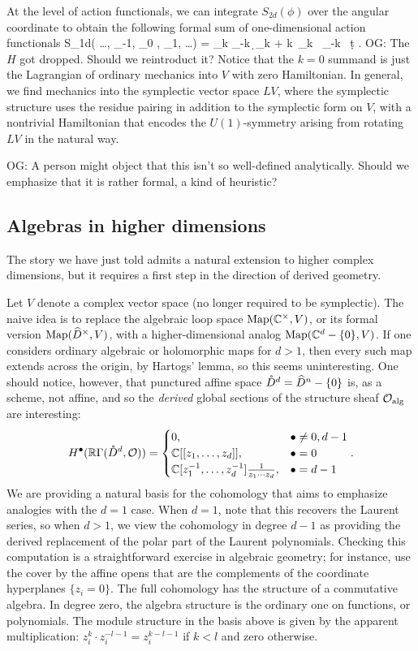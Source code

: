 \documentclass[11pt]{amsart}
\def\owen#1{{\textcolor{violet!50!black}{OG: {#1}}}}
\begin{document}
At the level of action functionals, 
we can integrate $S_{2d}(\phi)$ over the angular coordinate to obtain the following formal sum of one-dimensional action functionals
\beqn
S_{1d}\left( \ldots, \phi_{-1}, \phi_0 , \phi_1, \ldots \right) = \sum_{k\in \ZZ} \int  \phi_{-k} \,\d \phi_{k} + k\, \phi_k \, \phi_{-k} \, \d t .
\eeqn 
\owen{The $H$ got dropped. Should we reintroduct it?}
Notice that the $k=0$ summand is just the Lagrangian of ordinary mechanics into $V$ with zero Hamiltonian. 
In general, we find mechanics into the symplectic vector space $LV$, where the symplectic structure uses the residue pairing in addition to the symplectic form on $V$, with a nontrivial Hamiltonian that encodes the $U(1)$-symmetry arising from rotating $LV$ in the natural way.

\owen{A person might object that this isn't so well-defined analytically. Should we emphasize that it is rather formal, a kind of heuristic?}

\subsection{Algebras in higher dimensions }
\label{s:alghigh}

The story we have just told admits a natural extension to higher complex dimensions,
but it requires a first step in the direction of derived geometry.

Let $V$ denote a complex vector space (no longer required to be symplectic).
The naive idea is to replace the algebraic loop space $\Map(\CC^\times,  V)$, or its formal version $\Map(\Hat{D}^\times, V)$, with a higher-dimensional analog $\Map(\CC^d -\{0\}, V)$.
If one considers ordinary algebraic or holomorphic maps for $d > 1$, 
then every such map extends across the origin, by Hartogs' lemma,
so this seems uninteresting.
One should notice, however, that punctured affine space $\mathring{D}^d = \Hat{D}^n -\{0\}$ is, as a scheme, not affine, 
and so the {\em derived} global sections of the structure sheaf $\cO_{\rm alg}$ are interesting:
\[
H^\bu(\RR \Gamma(\mathring{D}^d, \cO)) = \begin{cases} 
0, & \bu \neq 0, d-1 \\ 
\CC[[z_1,\ldots,z_d]], & \bu = 0 \\ 
\CC[z_1^{-1},\ldots,z_d^{-1}] \frac{1}{z_1 \cdots z_d}, & \bu = d-1 
\end{cases} .
\]
We are providing a natural basis for the cohomology 
that aims to emphasize analogies with the $d=1$ case.
When $d=1$, note that this recovers the Laurent series,
so when $d > 1$, 
we view the cohomology in degree $d-1$ as providing the derived replacement of the polar part of the Laurent polynomials.
Checking this computation is a straightforward exercise in algebraic geometry;
for instance, use the cover by the affine opens that are the complements of the coordinate hyperplanes $\{z_i =0\}$.
The full cohomology has the structure of a commutative algebra. 
In degree zero, the algebra structure is the ordinary one on functions, or polynomials.
The module structure in the basis above is given by the apparent multiplication: $z_i^k \cdot z_i^{-l-1} = z_i^{k-l-1}$ if $k < l$ and zero otherwise.
\end{document}
